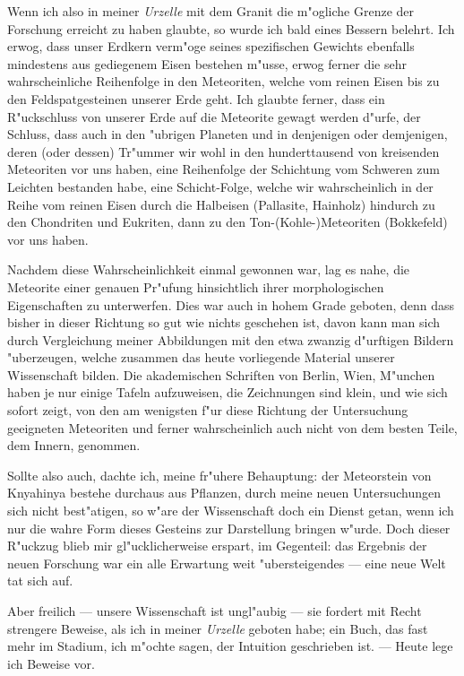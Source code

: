 \documentclass[a4paper, 11pt, oneside]{article}
\begin{document}
Wenn ich also in meiner \emph{Urzelle} mit dem Granit die m"ogliche Grenze der Forschung erreicht zu haben glaubte, so wurde ich bald eines Bessern belehrt. Ich erwog, dass unser Erdkern verm"oge seines spezifischen Gewichts ebenfalls mindestens aus gediegenem Eisen bestehen m"usse, erwog ferner die sehr wahrscheinliche Reihenfolge in den Meteoriten, welche vom reinen Eisen bis zu den Feldspatgesteinen unserer Erde geht. Ich glaubte ferner, dass ein R"uckschluss von unserer Erde auf die Meteorite gewagt werden d"urfe, der Schluss, dass auch in den "ubrigen Planeten und in denjenigen oder demjenigen, deren (oder dessen) Tr"ummer wir wohl in den hunderttausend von kreisenden Meteoriten vor uns haben, eine Reihenfolge der Schichtung vom Schweren zum Leichten bestanden habe, eine Schicht-Folge, welche wir wahrscheinlich in der Reihe vom reinen Eisen durch die Halbeisen (Pallasite, Hainholz) hindurch zu den Chondriten und Eukriten, dann zu den Ton-(Kohle-)Meteoriten (Bokkefeld) vor uns haben.

Nachdem diese Wahrscheinlichkeit einmal gewonnen war, lag es nahe, die Meteorite einer genauen Pr"ufung hinsichtlich ihrer morphologischen Eigenschaften zu unterwerfen. Dies war auch in hohem Grade geboten, denn dass bisher in dieser Richtung so gut wie nichts geschehen ist, davon kann man sich durch Vergleichung meiner Abbildungen mit den etwa zwanzig d"urftigen Bildern "uberzeugen, welche zusammen das heute vorliegende Material unserer Wissenschaft bilden. Die akademischen Schriften von Berlin, Wien, M"unchen haben je nur einige Tafeln aufzuweisen, die Zeichnungen sind klein, und wie sich sofort zeigt, von den am wenigsten f"ur diese Richtung der Untersuchung geeigneten Meteoriten und ferner wahrscheinlich auch nicht von dem besten Teile, dem Innern, genommen.

Sollte also auch, dachte ich, meine fr"uhere Behauptung: der Meteorstein von Knyahinya bestehe durchaus aus Pflanzen, durch meine neuen Untersuchungen sich nicht best"atigen, so w"are der Wissenschaft doch ein Dienst getan, wenn ich nur die wahre Form dieses Gesteins zur Darstellung bringen w"urde. Doch dieser R"uckzug blieb mir gl"ucklicherweise erspart, im Gegenteil: das Ergebnis der neuen Forschung war ein alle Erwartung weit "ubersteigendes --- eine neue Welt tat sich auf.

Aber freilich --- unsere Wissenschaft ist ungl"aubig --- sie fordert mit Recht strengere Beweise, als ich in meiner \emph{Urzelle} geboten habe; ein Buch, das fast mehr im Stadium, ich m"ochte sagen, der Intuition geschrieben ist. --- Heute lege ich Beweise vor.
\end{document}

